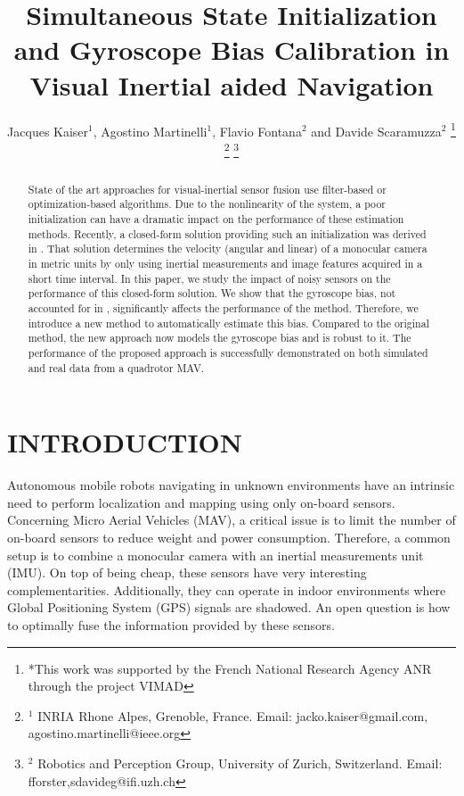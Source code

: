 \documentclass[letterpaper, 10 pt, conference]{ieeeconf}  %
\title{\LARGE \bf
Simultaneous State Initialization and Gyroscope Bias Calibration in Visual Inertial aided Navigation
}
\author{Jacques Kaiser$^{1}$, Agostino Martinelli$^{1}$, Flavio Fontana$^{2}$ and Davide Scaramuzza$^{2}$%
 \thanks{*This work was supported by the French National Research
Agency ANR through the project VIMAD}%
 \thanks{$^{1}$ INRIA Rhone Alpes, Grenoble, France. Email: jacko.kaiser@gmail.com, agostino.martinelli@ieee.org}%
 \thanks{$^{2}$ Robotics and Perception Group, University of Zurich, Switzerland. Email: fforster,sdavideg@ifi.uzh.ch}%
}
\begin{document}
\maketitle
\thispagestyle{empty}
\pagestyle{empty}



\begin{abstract}
State of the art approaches for visual-inertial sensor fusion use filter-based or optimization-based algorithms. Due to the nonlinearity of the system, a poor initialization can have a dramatic impact on the performance of these estimation methods.
Recently, a closed-form solution providing such an initialization was derived in \cite{Martinelli2014}.
That solution determines the velocity (angular and linear) of a monocular camera in metric units by only using inertial measurements and image features acquired in a short time interval.
In this paper, we study the impact of noisy sensors on the performance of this closed-form solution. We show that the gyroscope bias, not accounted for in \cite{Martinelli2014}, significantly affects the performance of the method.
Therefore, we introduce a new method to automatically estimate this bias.
Compared to the original method, the new approach now models the gyroscope bias and is robust to it.
The performance of the proposed approach is successfully demonstrated on both simulated and real data from a quadrotor MAV.
\end{abstract}



\section{INTRODUCTION}




Autonomous mobile robots navigating in unknown environments have an intrinsic need to perform localization and mapping using only on-board sensors.
Concerning Micro Aerial Vehicles (MAV), a critical issue is to limit the number of on-board sensors to reduce weight and power consumption.
Therefore, a common setup is to combine a monocular camera with an inertial measurements unit (IMU).
On top of being cheap, these sensors have very interesting complementarities.
Additionally, they can operate in indoor environments where Global Positioning System (GPS) signals are shadowed.
An open question is how to optimally fuse the information provided by these sensors.
\end{document}
